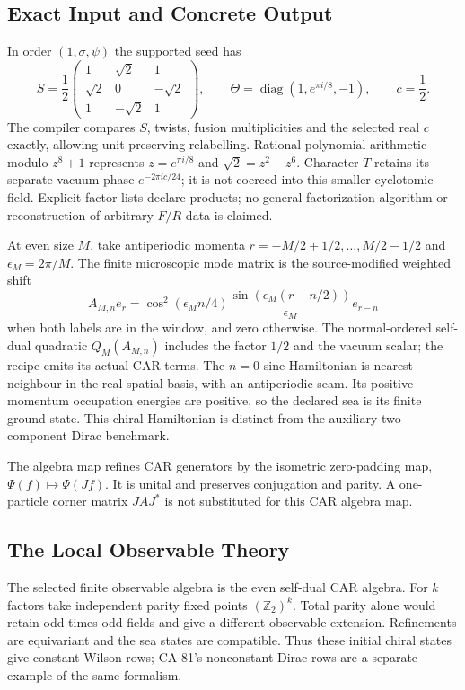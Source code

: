 \subsection{Exact Input and Concrete Output}

In order $(1,\sigma,\psi)$ the supported seed has
\[
 S=\frac12\begin{pmatrix}1&\sqrt2&1\\\sqrt2&0&-\sqrt2\\1&-\sqrt2&1\end{pmatrix},
 \qquad \Theta=\operatorname{diag}(1,e^{\pi i/8},-1),\qquad c=\frac12.
\]
The compiler compares $S$, twists, fusion multiplicities and the selected
real $c$ exactly, allowing unit-preserving relabelling. Rational polynomial
arithmetic modulo $z^8+1$ represents $z=e^{\pi i/8}$ and
$\sqrt2=z^2-z^6$. Character $T$ retains its separate vacuum phase
$e^{-2\pi i c/24}$; it is not coerced into this smaller cyclotomic field.
Explicit factor lists declare products; no general factorization algorithm
or reconstruction of arbitrary $F/R$ data is claimed.

At even size $M$, take antiperiodic momenta
$r=-M/2+1/2,\ldots,M/2-1/2$ and $\epsilon_M=2\pi/M$. The finite
microscopic mode matrix is the source-modified weighted shift
\[
 A_{M,n}e_r=\cos^2(\epsilon_M n/4)
 \frac{\sin(\epsilon_M(r-n/2))}{\epsilon_M}e_{r-n}
\]
when both labels are in the window, and zero otherwise. The normal-ordered
self-dual quadratic $Q_M(A_{M,n})$ includes the factor $1/2$ and the
vacuum scalar; the recipe emits its actual CAR terms.
The $n=0$ sine Hamiltonian is nearest-neighbour in the real spatial basis,
with an antiperiodic seam. Its positive-momentum occupation energies are
positive, so the declared sea is its finite ground state. This chiral
Hamiltonian is distinct from the auxiliary two-component Dirac benchmark.

The algebra map refines CAR generators by the isometric zero-padding map,
$\Psi(f)\mapsto\Psi(Jf)$. It is unital and preserves conjugation and
parity. A one-particle corner matrix $JAJ^*$ is not substituted for this
CAR algebra map.

\subsection{The Local Observable Theory}

The selected finite observable algebra is the even self-dual CAR algebra.
For $k$ factors take independent parity fixed points $(\mathbb Z_2)^k$.
Total parity alone would retain odd-times-odd fields and give a different
observable extension. Refinements are equivariant and the sea states are
compatible. Thus these initial chiral states give constant Wilson rows;
CA-81's nonconstant Dirac rows are a separate example of the same formalism.

